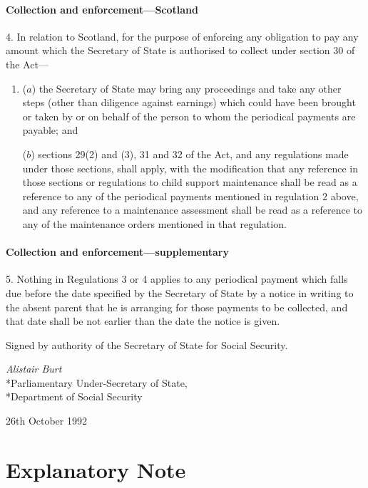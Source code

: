 \documentclass[a4paper]{article}
\begin{document}
\subsection[4. Collection and enforcement—Scotland]{Collection and enforcement—Scotland}

4.  In relation to Scotland, for the purpose of enforcing any obligation to pay any amount which the Secretary of State is authorised to collect under section 30 of the Act—
\begin{enumerate}\item[]
($a$) the Secretary of State may bring any proceedings and take any other steps (other than diligence against earnings) which could have been brought or taken by or on behalf of the person to whom the periodical payments are payable; and

($b$) sections 29(2) and (3), 31 and 32 of the Act, and any regulations made under those sections, shall apply, with the modification that any reference in those sections or regulations to child support maintenance shall be read as a reference to any of the periodical payments mentioned in regulation 2 above, and any reference to a maintenance assessment shall be read as a reference to any of the maintenance orders mentioned in that regulation.
\end{enumerate}

\subsection[5. Collection and enforcement—supplementary]{Collection and enforcement—supplementary}

5.  Nothing in Regulations 3 or 4 applies to any periodical payment which falls due before the date specified by the Secretary of State by a notice in writing to the absent parent that he is arranging for those payments to be collected, and that date shall be not earlier than the date the notice is given.

\bigskip

Signed by authority of the Secretary of State for Social Security.

{\raggedleft
\emph{Alistair Burt}\\*Parliamentary Under-Secretary of State,\\*Department of Social Security

}

26th October 1992

\part{Explanatory Note}
\end{document}
